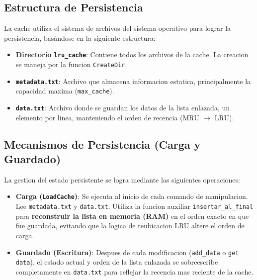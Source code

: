     \subsection{Estructura de Persistencia}
    La cache utiliza el sistema de archivos del sistema operativo para lograr la persistencia, basándose en la siguiente estructura:
    \begin{itemize}
        \item \textbf{Directorio \texttt{lru\_cache}}: Contiene todos los archivos de la cache. La creacion se maneja por la funcion \texttt{CreateDir}.
        \item \textbf{\texttt{metadata.txt}}: Archivo que almacena informacion estatica, principalmente la capacidad maxima (\texttt{max\_cache}).
        \item \textbf{\texttt{data.txt}}: Archivo donde se guardan los datos de la lista enlazada, un elemento por linea, manteniendo el orden de recencia (MRU $\rightarrow$ LRU).
    \end{itemize}

    \subsection{Mecanismos de Persistencia (Carga y Guardado)}
    La gestion del estado persistente se logra mediante las siguientes operaciones:
    \begin{itemize}
        \item \textbf{Carga (\texttt{LoadCache})}: Se ejecuta al inicio de cada comando de manipulacion. Lee \texttt{metadata.txt} y \texttt{data.txt}. Utiliza la funcion auxiliar \texttt{insertar\_al\_final} para \textbf{reconstruir la lista en memoria (RAM)} en el orden exacto en que fue guardada, evitando que la logica de reubicacion LRU altere el orden de carga.
        \item \textbf{Guardado (Escritura)}: Despues de cada modificacion (\texttt{add\_data} o \texttt{get data}), el estado actual y orden de la lista enlazada se sobreescribe completamente en \texttt{data.txt} para reflejar la recencia mas reciente de la cache.
    \end{itemize}
\newpage
